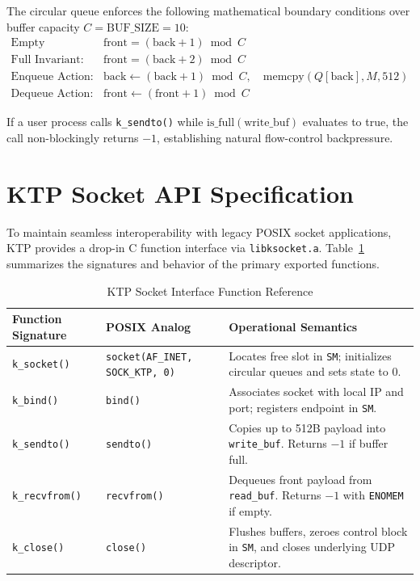 \documentclass[11pt,a4paper]{article}
\begin{document}
The circular queue enforces the following mathematical boundary conditions over buffer capacity $C = \text{BUF\_SIZE} = 10$:
\begin{align}
    \text{Empty Invariant:} \quad & \text{front} = (\text{back} + 1) \bmod C \\
    \text{Full Invariant:} \quad & \text{front} = (\text{back} + 2) \bmod C \\
    \text{Enqueue Action:} \quad & \text{back} \leftarrow (\text{back} + 1) \bmod C, \quad \text{memcpy}(Q[\text{back}], M, 512) \\
    \text{Dequeue Action:} \quad & \text{front} \leftarrow (\text{front} + 1) \bmod C
\end{align}

If a user process calls \texttt{k\_sendto()} while $\text{is\_full}(\text{write\_buf})$ evaluates to true, the call non-blockingly returns $-1$, establishing natural flow-control backpressure.

\section{KTP Socket API Specification}
\label{sec:api_spec}

To maintain seamless interoperability with legacy POSIX socket applications, KTP provides a drop-in C function interface via \texttt{libksocket.a}. Table~\ref{tab:api_summary} summarizes the signatures and behavior of the primary exported functions.

\begin{table}[htbp]
\centering
\small
\caption{KTP Socket Interface Function Reference}
\label{tab:api_summary}
\begin{tabularx}{\linewidth}{>{\raggedright\arraybackslash}p{3.4cm}>{\raggedright\arraybackslash}p{3.4cm}X}
\toprule
\textbf{Function Signature} & \textbf{POSIX Analog} & \textbf{Operational Semantics} \\
\midrule
\texttt{k\_socket()} & \texttt{socket(AF\_INET, SOCK\_KTP, 0)} & Locates free slot in \texttt{SM}; initializes circular queues and sets state to 0. \\
\addlinespace
\texttt{k\_bind()} & \texttt{bind()} & Associates socket with local IP and port; registers endpoint in \texttt{SM}. \\
\addlinespace
\texttt{k\_sendto()} & \texttt{sendto()} & Copies up to 512B payload into \texttt{write\_buf}. Returns $-1$ if buffer full. \\
\addlinespace
\texttt{k\_recvfrom()} & \texttt{recvfrom()} & Dequeues front payload from \texttt{read\_buf}. Returns $-1$ with \texttt{ENOMEM} if empty. \\
\addlinespace
\texttt{k\_close()} & \texttt{close()} & Flushes buffers, zeroes control block in \texttt{SM}, and closes underlying UDP descriptor. \\
\bottomrule
\end{tabularx}
\end{table}
\end{document}
